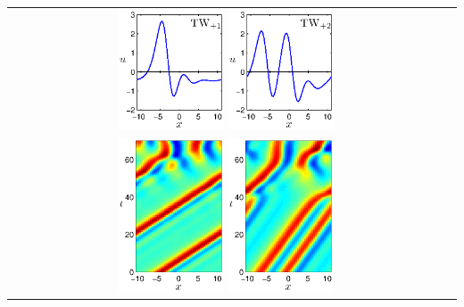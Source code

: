 \documentclass{beamer}
\begin{document}
\begin{frame}{\reqva}
 \begin{tabular}{cc}
 \includegraphics[width=0.25\textwidth]{../../figs/ks22_TW1_profile}
 \includegraphics[width=0.25\textwidth]{../../figs/ks22_TW2_profile}\\
 \includegraphics[width=0.25\textwidth]{../../figs/ks22_TW1_orbit_c}
 \includegraphics[width=0.25\textwidth]{../../figs/ks22_TW2_orbit_c}
 \end{tabular}
\end{frame}
\end{document}
